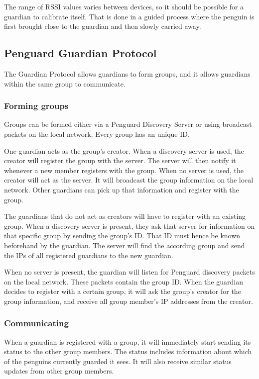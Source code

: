 \documentclass{report}
\begin{document}
The range of RSSI values varies between devices, so it should be possible for a guardian to calibrate itself. That is done in a guided process where the penguin is first brought close to the guardian and then slowly carried away.

\subsection{Penguard Guardian Protocol}

The Guardian Protocol allows guardians to form groups, and it allows guardians within the same group to communicate.

\subsubsection{Forming groups}

Groups can be formed either via a Penguard Discovery Server or using broadcast packets on the local network. Every group has an unique ID.

One guardian acts as the group's creator. When a discovery server is used, the creator will register the group with the server. The server will then notify it whenever a new member registers with the group. When no server is used, the creator will act as the server. It will broadcast the group information on the local network. Other guardians can pick up that information and register with the group.

The guardians that do not act as creators will have to register with an existing group. When a discovery server is present, they ask that server for information on that specific group by sending the group's ID. That ID must hence be known beforehand by the guardian. The server will find the according group and send the IPs of all registered guardians to the new guardian.

When no server is present, the guardian will listen for Penguard discovery packets on the local network. These packets contain the group ID. When the guardian decides to register with a certain group, it will ask the group's creator for the group information, and receive all group member's IP addresses from the creator.

\subsubsection{Communicating}

When a guardian is registered with a group, it will immediately start sending its status to the other group members. The status includes information about which of the penguins currently guarded it sees. It will also receive similar status updates from other group members.
\end{document}
